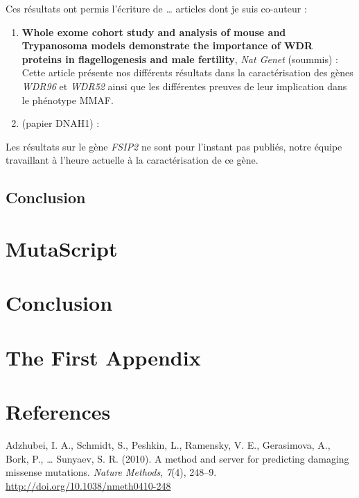 \documentclass[12pt,twoside]{reedthesis}
\theoremstyle{definition}
\theoremstyle{definition}
\theoremstyle{remark}
\begin{document}
  Ces résultats ont permis l'écriture de \ldots{} articles dont je suis
  co-auteur :
  
  \begin{enumerate}
  \def\labelenumi{\arabic{enumi}.}
  \item
    \textbf{Whole exome cohort study and analysis of mouse and Trypanosoma
    models demonstrate the importance of WDR proteins in flagellogenesis
    and male fertility}, \emph{Nat Genet} (soummis) : Cette article
    présente nos différents résultats dans la caractérisation des gènes
    \emph{WDR96} et \emph{WDR52} ainsi que les différentes preuves de leur
    implication dans le phénotype MMAF.
  \item
    (papier DNAH1) :
  \end{enumerate}
  
  Les résultats sur le gène \emph{FSIP2} ne sont pour l'instant pas
  publiés, notre équipe travaillant à l'heure actuelle à la
  caractérisation de ce gène.
  
  \section{Conclusion}\label{conclusion}
  
  \chapter{MutaScript}\label{mutascript}
  
  \chapter*{Conclusion}\label{conclusion-1}
  
  \chapter{The First Appendix}\label{the-first-appendix}
  
  \chapter*{References}\label{references}
  
  \hypertarget{refs}{}
  \hypertarget{ref-Adzhubei2010}{}
  Adzhubei, I. A., Schmidt, S., Peshkin, L., Ramensky, V. E., Gerasimova,
  A., Bork, P., \ldots{} Sunyaev, S. R. (2010). A method and server for
  predicting damaging missense mutations. \emph{Nature Methods},
  \emph{7}(4), 248--9. \url{http://doi.org/10.1038/nmeth0410-248}
  
\end{document}
